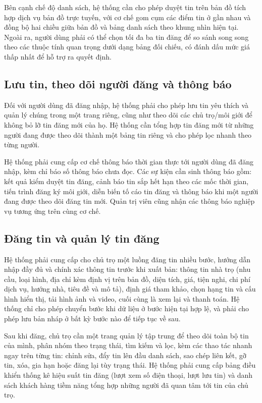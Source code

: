Bên cạnh chế độ danh sách, hệ thống cần cho phép duyệt tin trên bản đồ tích hợp dịch vụ bản đồ trực tuyến, với cơ chế gom cụm các điểm tin ở gần nhau và đồng bộ hai chiều giữa bản đồ và bảng danh sách theo khung nhìn hiện tại. Ngoài ra, người dùng phải có thể chọn tối đa ba tin đăng để so sánh song song theo các thuộc tính quan trọng dưới dạng bảng đối chiếu, có đánh dấu mức giá thấp nhất để hỗ trợ ra quyết định.

\FloatBarrier
\subsection{Lưu tin, theo dõi người đăng và thông báo}

Đối với người dùng đã đăng nhập, hệ thống phải cho phép lưu tin yêu thích và quản lý chúng trong một trang riêng, cũng như theo dõi các chủ trọ/môi giới để không bỏ lỡ tin đăng mới của họ. Hệ thống cần tổng hợp tin đăng mới từ những người đang được theo dõi thành một bảng tin riêng và cho phép lọc nhanh theo từng người.

Hệ thống phải cung cấp cơ chế thông báo thời gian thực tới người dùng đã đăng nhập, kèm chỉ báo số thông báo chưa đọc. Các sự kiện cần sinh thông báo gồm: kết quả kiểm duyệt tin đăng, cảnh báo tin sắp hết hạn theo các mốc thời gian, tiến trình đăng ký môi giới, diễn biến tố cáo tin đăng và thông báo khi một người đang được theo dõi đăng tin mới. Quản trị viên cũng nhận các thông báo nghiệp vụ tương ứng trên cùng cơ chế.

\FloatBarrier
\subsection{Đăng tin và quản lý tin đăng}

Hệ thống phải cung cấp cho chủ trọ một luồng đăng tin nhiều bước, hướng dẫn nhập đầy đủ và chính xác thông tin trước khi xuất bản: thông tin nhà trọ (nhu cầu, loại hình, địa chỉ kèm định vị trên bản đồ, diện tích, giá, tiện nghi, chi phí dịch vụ, hướng nhà, tiêu đề và mô tả), định giá tham khảo, chọn hạng tin và cấu hình hiển thị, tải hình ảnh và video, cuối cùng là xem lại và thanh toán. Hệ thống chỉ cho phép chuyển bước khi dữ liệu ở bước hiện tại hợp lệ, và phải cho phép lưu bản nháp ở bất kỳ bước nào để tiếp tục về sau.

Sau khi đăng, chủ trọ cần một trang quản lý tập trung để theo dõi toàn bộ tin của mình, phân nhóm theo trạng thái, tìm kiếm và lọc, kèm các thao tác nhanh ngay trên từng tin: chỉnh sửa, đẩy tin lên đầu danh sách, sao chép liên kết, gỡ tin, xóa, gia hạn hoặc đăng lại tùy trạng thái. Hệ thống phải cung cấp bảng điều khiển thống kê hiệu suất tin đăng (lượt xem số điện thoại, lượt lưu tin) và danh sách khách hàng tiềm năng tổng hợp những người đã quan tâm tới tin của chủ trọ.

